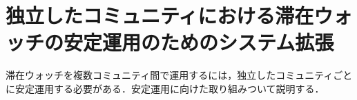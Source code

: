 \section{独立したコミュニティにおける滞在ウォッチの安定運用のためのシステム拡張}
\label{sec:description}
滞在ウォッチを複数コミュニティ間で運用するには，独立したコミュニティごとに安定運用する必要がある．安定運用に向けた取り組みついて説明する．

% 

